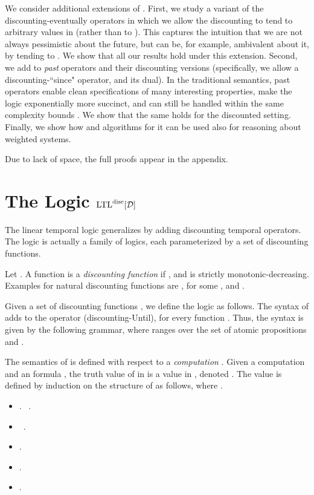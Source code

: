 \documentclass{llncs}
\newcommand{\LTL}{{\ensuremath{\rm LTL}}\xspace}
\newcommand{\D}{{\cal D}}
\newcommand{\DLTL}{\ensuremath{\LTL^{\text{disc}}[\D]}}
\begin{document}
We consider additional extensions of . First, we study a variant of the discounting-eventually operators in which we allow the discounting
to tend to arbitrary values in  (rather than to ). This captures the intuition that we are not always pessimistic about the future, but can be, for example, ambivalent about it, by tending to . We show that all our results hold under this extension.
Second, we add to  {\em past\/} operators and their discounting versions (specifically, we allow a discounting-``since" operator, and its dual). In the traditional semantics, past operators enable clean specifications of many interesting properties, make the logic exponentially more succinct, and can still be handled within the same complexity bounds \cite{LS94,LPZ85}. We show that the same holds for the discounted setting.
Finally, we show how  and algorithms for it can be used also for reasoning about weighted systems.



Due to lack of space, the full proofs appear in the appendix.


\section{The Logic \DLTL}
The linear temporal logic  generalizes  by adding discounting temporal operators. The logic is actually a family of logics, each parameterized by a set  of discounting functions.

Let . A function  is a {\em discounting function} if , and  is strictly monotonic-decreasing. Examples for natural discounting functions are , for some , and .

Given a set of discounting functions , we define the logic  as follows. The syntax of  adds to  the operator  (discounting-Until),
for every function .
Thus, the syntax is given by the following grammar, where  ranges over the set  of atomic propositions and .



The semantics of  is defined with respect to a {\em computation\/} . Given a computation  and an  formula , the truth value of  in  is a value in , denoted . The value is defined by induction on the structure of  as follows, where .
\begin{itemize}
\item . \hspace{2.98cm}  ~.
\item   \hspace{1.5cm}  ~.
\item .
\item .
\item .


\end{itemize}
\end{document}
